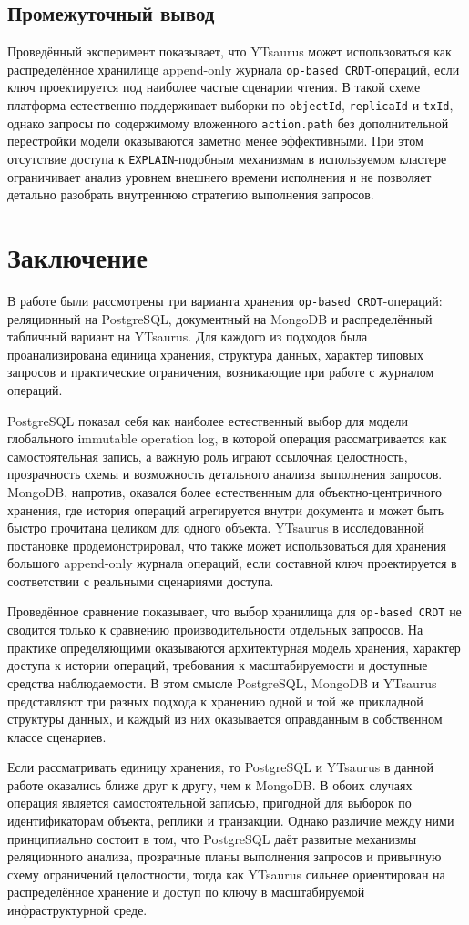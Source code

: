 \documentclass[a4paper,14pt]{extarticle}
\def\uppercase#1{#1}%
\def\makefirstuc#1{#1}%
\def\normalsize{}%
\newcommand{\withoutnumber}[1]{%
    \clearpage
    \section*{\centering\normalsize\uppercase{#1}}
    \addcontentsline{toc}{section}{\normalsize \uppercase{#1}}
}
\newcommand{\mysubsection}[1]{%
    \subsection{\normalsize\makefirstuc{#1}}
}
\begin{document}
\mysubsection{Промежуточный вывод}

Проведённый эксперимент показывает, что YTsaurus может использоваться как
распределённое хранилище append-only журнала \texttt{op-based CRDT}-операций,
если ключ проектируется под наиболее частые сценарии чтения. В такой схеме
платформа естественно поддерживает выборки по \texttt{objectId},
\texttt{replicaId} и \texttt{txId}, однако запросы по содержимому вложенного
\texttt{action.path} без дополнительной перестройки модели оказываются заметно
менее эффективными. При этом отсутствие доступа к \texttt{EXPLAIN}-подобным
механизмам в используемом кластере ограничивает анализ уровнем внешнего
времени исполнения и не позволяет детально разобрать внутреннюю стратегию
выполнения запросов.

\withoutnumber{Заключение}

В работе были рассмотрены три варианта хранения \texttt{op-based CRDT}-операций:
реляционный на PostgreSQL, документный на MongoDB и распределённый табличный
вариант на YTsaurus. Для каждого из подходов была проанализирована единица
хранения, структура данных, характер типовых запросов и практические ограничения,
возникающие при работе с журналом операций.

PostgreSQL показал себя как наиболее естественный выбор для модели глобального
immutable operation log, в которой операция рассматривается как самостоятельная
запись, а важную роль играют ссылочная целостность, прозрачность схемы и
возможность детального анализа выполнения запросов. MongoDB, напротив, оказался
более естественным для объектно-центричного хранения, где история операций
агрегируется внутри документа и может быть быстро прочитана целиком для одного
объекта. YTsaurus в исследованной постановке продемонстрировал, что также может
использоваться для хранения большого append-only журнала операций, если
составной ключ проектируется в соответствии с реальными сценариями доступа.

Проведённое сравнение показывает, что выбор хранилища для \texttt{op-based CRDT}
не сводится только к сравнению производительности отдельных запросов. На
практике определяющими оказываются архитектурная модель хранения, характер
доступа к истории операций, требования к масштабируемости и доступные средства
наблюдаемости. В этом смысле PostgreSQL, MongoDB и YTsaurus представляют три
разных подхода к хранению одной и той же прикладной структуры данных, и каждый
из них оказывается оправданным в собственном классе сценариев.

Если рассматривать единицу хранения, то PostgreSQL и YTsaurus в данной работе
оказались ближе друг к другу, чем к MongoDB. В обоих случаях операция является
самостоятельной записью, пригодной для выборок по идентификаторам объекта,
реплики и транзакции. Однако различие между ними принципиально состоит в том,
что PostgreSQL даёт развитые механизмы реляционного анализа, прозрачные планы
выполнения запросов и привычную схему ограничений целостности, тогда как
YTsaurus сильнее ориентирован на распределённое хранение и доступ по ключу в
масштабируемой инфраструктурной среде.
\end{document}
